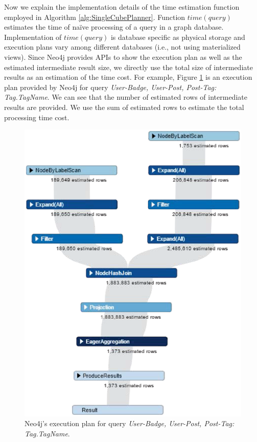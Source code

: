 	Now we explain the implementation details of the time estimation function employed in Algorithm \ref{alg:SingleCubePlanner}.
	Function \textbf{$time(query)$} estimates the time of na\"ive  processing of a query in a graph database. Implementation of $time(query)$ is database specific as physical storage and execution plans vary among different databases (i.e., not using materialized views). Since Neo4j provides APIs to show the execution plan as well as the estimated intermediate result size, we directly use the total size of intermediate results as an estimation of the time cost. For example, Figure \ref{fig:4:2} is an execution plan provided by Neo4j for query \textit{User-Badge, User-Post, Post-Tag: Tag.TagName}. We can see that the number of estimated rows of intermediate results are provided. We use the sum of estimated rows to estimate the total processing time cost.
	
	\begin {figure}[h]
	\centering
	\includegraphics[scale=0.6]{pic/61.eps}
	\caption{Neo4j's execution plan for query \textit{User-Badge, User-Post, Post-Tag: Tag.TagName}.}
	\label{fig:4:2}
\end{figure}

